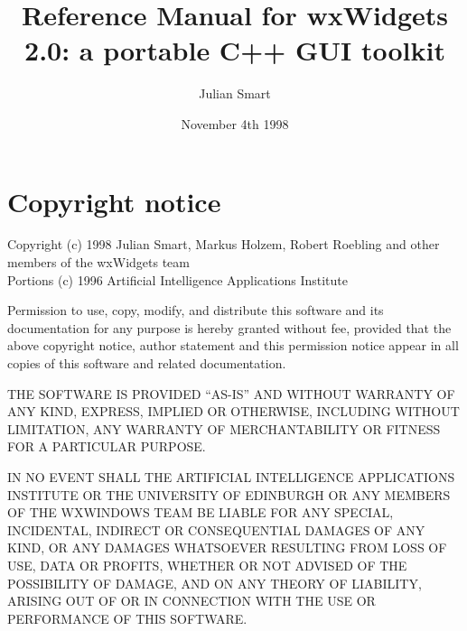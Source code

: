 \addtolength{\textwidth}{1in}
\addtolength{\oddsidemargin}{-0.5in}
\addtolength{\topmargin}{-0.5in}
\addtolength{\textheight}{1in}
\sloppy
\newcommand{\indexit}[1]{#1\index{#1}}
\newcommand{\pipe}[0]{$\|$\ }%



\parskip=10pt
\parindent=0pt
\title{Reference Manual for wxWidgets 2.0: a portable C++ GUI toolkit}
\author{Julian Smart}
\date{November 4th 1998}

\makeindex

\maketitle

\pagestyle{fancyplain}

\setfooter{\thepage}{}{}{}{}{\thepage}
\tableofcontents


\chapter*{Copyright notice}
%
\setfooter{\thepage}{}{}{}{}{\thepage}

\begin{center}
Copyright (c) 1998 Julian Smart, Markus Holzem, Robert Roebling and other
members of the wxWidgets team\\
Portions (c) 1996 Artificial Intelligence Applications Institute\\
\end{center}

Permission to use, copy, modify, and distribute this software and its
documentation for any purpose is hereby granted without fee, provided that the
above copyright notice, author statement and this permission notice appear in
all copies of this software and related documentation.

THE SOFTWARE IS PROVIDED ``AS-IS'' AND WITHOUT WARRANTY OF ANY KIND, EXPRESS,
IMPLIED OR OTHERWISE, INCLUDING WITHOUT LIMITATION, ANY WARRANTY OF
MERCHANTABILITY OR FITNESS FOR A PARTICULAR PURPOSE.

IN NO EVENT SHALL THE ARTIFICIAL INTELLIGENCE APPLICATIONS INSTITUTE OR THE
UNIVERSITY OF EDINBURGH OR ANY MEMBERS OF THE WXWINDOWS TEAM BE LIABLE FOR ANY SPECIAL, INCIDENTAL, INDIRECT OR
CONSEQUENTIAL DAMAGES OF ANY KIND, OR ANY DAMAGES WHATSOEVER RESULTING FROM
LOSS OF USE, DATA OR PROFITS, WHETHER OR NOT ADVISED OF THE POSSIBILITY OF
DAMAGE, AND ON ANY THEORY OF LIABILITY, ARISING OUT OF OR IN CONNECTION WITH
THE USE OR PERFORMANCE OF THIS SOFTWARE.

